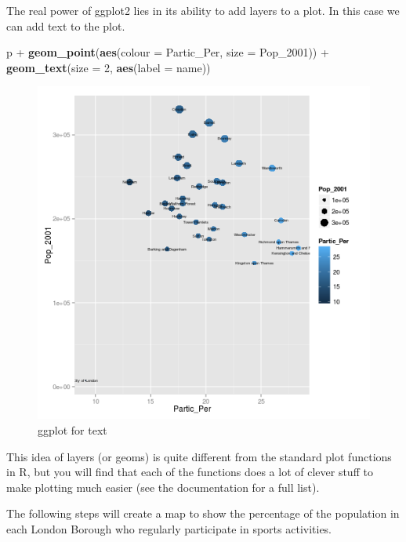 \documentclass[]{article}
\newenvironment{Shaded}{}{}
\newcommand{\KeywordTok}[1]{\textcolor[rgb]{0.00,0.44,0.13}{\textbf{{#1}}}}
\newcommand{\DataTypeTok}[1]{\textcolor[rgb]{0.56,0.13,0.00}{{#1}}}
\newcommand{\DecValTok}[1]{\textcolor[rgb]{0.25,0.63,0.44}{{#1}}}
\newcommand{\StringTok}[1]{\textcolor[rgb]{0.25,0.44,0.63}{{#1}}}
\newcommand{\NormalTok}[1]{{#1}}
\begin{document}
The real power of ggplot2 lies in its ability to add layers to a plot.
In this case we can add text to the plot.

\begin{Shaded}
\begin{Highlighting}[]
\NormalTok{p +}\StringTok{ }\KeywordTok{geom_point}\NormalTok{(}\KeywordTok{aes}\NormalTok{(}\DataTypeTok{colour =} \NormalTok{Partic_Per, }\DataTypeTok{size =} \NormalTok{Pop_2001)) +}\StringTok{ }\KeywordTok{geom_text}\NormalTok{(}\DataTypeTok{size =} \DecValTok{2}\NormalTok{, }
    \KeywordTok{aes}\NormalTok{(}\DataTypeTok{label =} \NormalTok{name))}
\end{Highlighting}
\end{Shaded}

\begin{figure}[htbp]
\centering
\includegraphics{figure/ggplot_for_text.png}
\caption{ggplot for text}
\end{figure}

This idea of layers (or geoms) is quite different from the standard plot
functions in R, but you will find that each of the functions does a lot
of clever stuff to make plotting much easier (see the documentation for
a full list).

The following steps will create a map to show the percentage of the
population in each London Borough who regularly participate in sports
activities.
\end{document}
